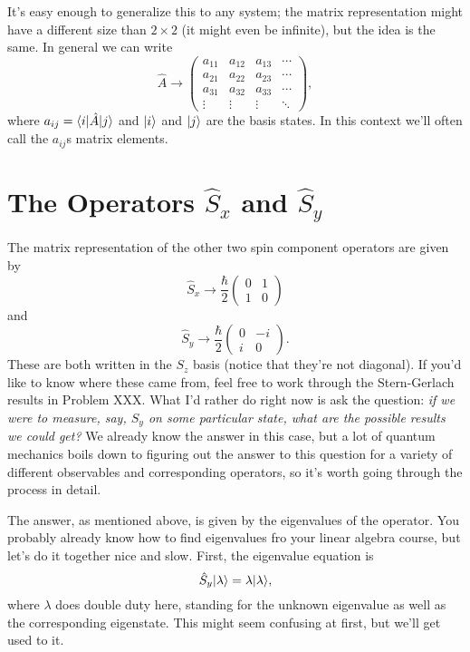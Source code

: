 It's easy enough to generalize this to any system; the matrix representation might have a different size than $2 \times 2$ (it might even be infinite), but the idea is the same.  In general we can write
\begin{equation}
\hat{A} \to \begin{pmatrix} 
a_{11} & a_{12} & a_{13} & \cdots \\ 
a_{21} & a_{22} & a_{23} & \cdots \\
a_{31} & a_{32} & a_{33} & \cdots \\
\vdots & \vdots & \vdots  & \ddots
\end{pmatrix},
\end{equation}
where $a_{ij} = \langle i | \hat{A} | j \rangle$ and $| i \rangle$ and $| j \rangle$ are the basis states.  In this context we'll often call the $a_{ij}$s matrix elements.


\section{The Operators $\hat{S}_x$ and $\hat{S}_y$}

The matrix representation of the other two spin component operators are given by
\begin{equation}
\label{eq_sx_matrix}
\hat{S}_x \to \frac{\hbar}{2} \begin{pmatrix} 0 & 1 \\ 1 & 0 \end{pmatrix}
\end{equation}
and 
\begin{equation}
\label{eq_sy_matrix}
\hat{S}_y \to \frac{\hbar}{2} \begin{pmatrix} 0 & -i \\ i & 0 \end{pmatrix}.
\end{equation}
These are both written in the $S_z$ basis (notice that they're not diagonal).  If you'd like to know where these came from, feel free to work through the Stern-Gerlach results in Problem XXX.  What I'd rather do right now is ask the question: \emph{if we were to measure, say, $S_y$ on some particular state, what are the possible results we could get?}  We already know the answer in this case, but a lot of quantum mechanics boils down to figuring out the answer to this question for a variety of different observables and corresponding operators, so it's worth going through the process in detail.

The answer, as mentioned above, is given by the eigenvalues of the operator. You probably already know how to find eigenvalues fro your linear algebra course, but let's do it together nice and slow.  First, the eigenvalue equation is
\begin{equation}
\label{eq_eigeny}
\hat{S}_y | \lambda \rangle = \lambda | \lambda \rangle,
\end{equation}
where $\lambda$ does double duty here, standing for the unknown eigenvalue as well as the corresponding eigenstate.  This might seem confusing at first, but we'll get used to it. 

